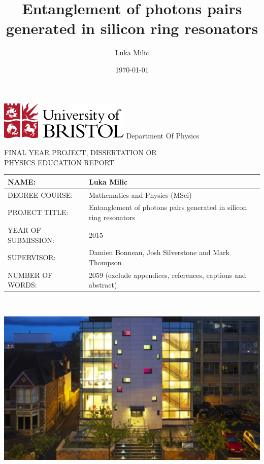 \documentclass[11pt]{article}
\title{Entanglement of photons pairs generated in silicon ring resonators}
\date{\today}
\author{Luka Milic}
\numberwithin{equation}{section}
\numberwithin{figure}{section}
\begin{document}
\begin{titlepage}
  \includegraphics[scale=0.6]{img/uob-logo.png}\hfill
  \LARGE Department Of Physics \\
  \begin{center}
    FINAL YEAR PROJECT, DISSERTATION OR\\
    PHYSICS EDUCATION REPORT
  \end{center} 

  \large
  {\renewcommand{\arraystretch}{2}%
  \begin{tabular}[t]{|l|p{10cm}|}
    \hline
    NAME: & Luka Milic \\ \hline
    DEGREE COURSE: & Mathematics and Physics (MSci)\\ \hline
    PROJECT TITLE: & Entanglement of photons pairs generated in silicon ring resonators \\ \hline
    YEAR OF SUBMISSION: & 2015\\ \hline
    SUPERVISOR: & Damien Bonneau, Josh Silverstone and Mark Thompson\\ \hline
    NUMBER OF WORDS: & 2059 (exclude appendices, references, captions and abstract)\\ \hline
  \end{tabular} } \quad
  \\[1.5cm]
  \begin{center}
    \includegraphics[scale=0.7]{img/nsqi.jpg}
  \end{center}
\end{titlepage}
\newpage
\maketitle
\end{document}
